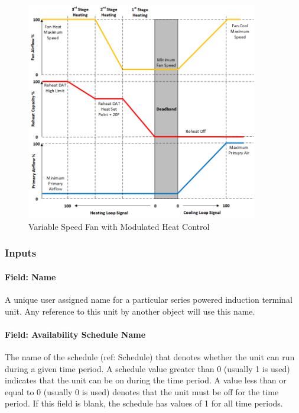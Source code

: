 \begin{figure}[hbtp] %
\centering
\includegraphics[width=0.9\textwidth, height=0.9\textheight, keepaspectratio=true]{media/SeriesVSFanModulatedHeatControlDiag.png}
\caption{Variable Speed Fan with Modulated Heat Control \protect \label{fig:series-piu-terminal-unit-VS-modulated-heat}}
\end{figure}


\subsubsection{Inputs}\label{inputs-7-000}

\paragraph{Field: Name}\label{field-name-7-000}

A unique user assigned name for a particular series powered induction terminal unit. Any reference to this unit by another object will use this name.

\paragraph{Field: Availability Schedule Name}\label{field-availability-schedule-name-7}

The name of the schedule (ref: Schedule) that denotes whether the unit can run during a given time period. A schedule value greater than 0 (usually 1 is used) indicates that the unit can be on during the time period. A value less than or equal to 0 (usually 0 is used) denotes that the unit must be off for the time period. If this field is blank, the schedule has values of 1 for all time periods.

